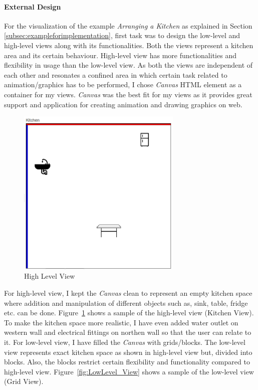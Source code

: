 \paragraph{External Design}
For the visualization of the example \textit{Arranging a Kitchen} as explained in Section \ref{subsec:exampleforimplementation}, first task was to design the low-level and high-level views along with its functionalities.
\newline\newline Both the views represent a kitchen area and its certain behaviour. High-level view has more functionalities and flexibility in usage than the low-level view. As both the views are independent of each other and resonates a confined area in which certain task related to animation/graphics has to be performed, I chose \textit{Canvas} \cite{canvas} HTML element as a container for my views. \textit{Canvas} was the best fit for my views as it provides great support and application for creating animation and drawing graphics on web.

\begin{figure}
	\includegraphics[width=0.7\textwidth]{figures/Highlevel_View}
	\caption{High Level View}
	\label{fig:HighLevel_View}
\end{figure}

For high-level view, I kept the \textit{Canvas} clean to represent an empty kitchen space where addition and manipulation of different objects such as, sink, table, fridge etc. can be done. Figure~\ref{fig:HighLevel_View} shows a sample of the high-level view (Kitchen View). To make the kitchen space more realistic, I have even added {\color{blue} water outlet} on western wall and {\color{red} electrical fittings} on northen wall so that the user can relate to it. For low-level view, I have filled the \textit{Canvas} with grids/blocks. The low-level view represents exact kitchen space as shown in high-level view but, divided into blocks. Also, the blocks restrict certain flexibility and functionality compared to high-level view. Figure~\ref{fig:LowLevel_View} shows a sample of the low-level view (Grid View).

